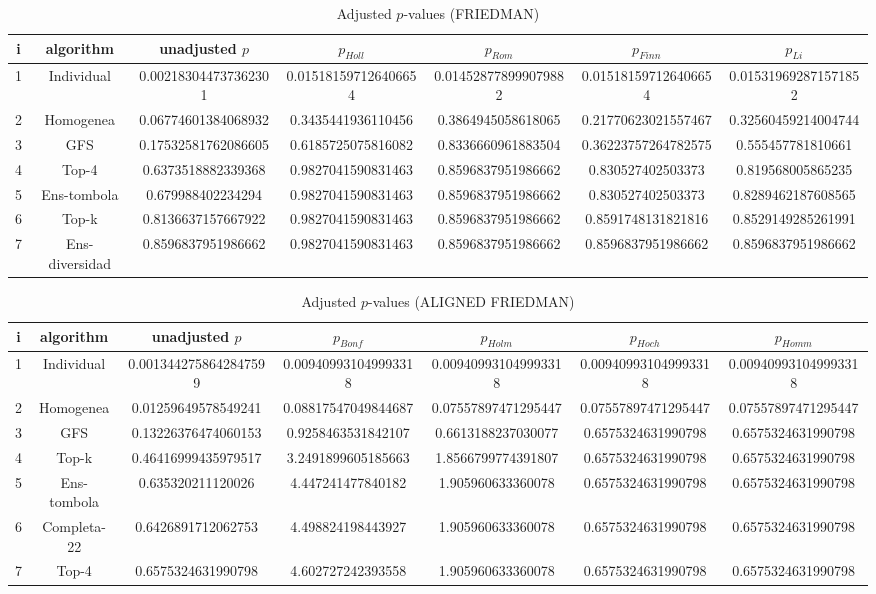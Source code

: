 \documentclass[a4paper,10pt]{article}
\begin{document}
\begin{landscape}
\begin{table}[!htp]
\centering\scriptsize
\caption{Adjusted $p$-values (FRIEDMAN)}
\begin{tabular}{ccccccc}
i&algorithm&unadjusted $p$&$p_{Holl}$&$p_{Rom}$&$p_{Finn}$&$p_{Li}$\\
\hline
1&Individual&0.002183044737362301&0.015181597126406654&0.014528778999079882&0.015181597126406654&0.015319692871571852\\
2&Homogenea&0.06774601384068932&0.3435441936110456&0.3864945058618065&0.21770623021557467&0.32560459214004744\\
3&GFS&0.17532581762086605&0.6185725075816082&0.8336660961883504&0.36223757264782575&0.555457781810661\\
4&Top-4&0.6373518882339368&0.9827041590831463&0.8596837951986662&0.830527402503373&0.819568005865235\\
5&Ens-tombola&0.679988402234294&0.9827041590831463&0.8596837951986662&0.830527402503373&0.8289462187608565\\
6&Top-k&0.8136637157667922&0.9827041590831463&0.8596837951986662&0.8591748131821816&0.8529149285261991\\
7&Ens-diversidad&0.8596837951986662&0.9827041590831463&0.8596837951986662&0.8596837951986662&0.8596837951986662\\
\hline
\end{tabular}
\end{table}


\newpage

\begin{table}[!htp]
\centering\scriptsize
\caption{Adjusted $p$-values (ALIGNED FRIEDMAN)}
\begin{tabular}{ccccccc}
i&algorithm&unadjusted $p$&$p_{Bonf}$&$p_{Holm}$&$p_{Hoch}$&$p_{Homm}$\\
\hline
1&Individual&0.0013442758642847599&0.009409931049993318&0.009409931049993318&0.009409931049993318&0.009409931049993318\\
2&Homogenea&0.01259649578549241&0.08817547049844687&0.07557897471295447&0.07557897471295447&0.07557897471295447\\
3&GFS&0.13226376474060153&0.9258463531842107&0.6613188237030077&0.6575324631990798&0.6575324631990798\\
4&Top-k&0.46416999435979517&3.2491899605185663&1.8566799774391807&0.6575324631990798&0.6575324631990798\\
5&Ens-tombola&0.635320211120026&4.447241477840182&1.905960633360078&0.6575324631990798&0.6575324631990798\\
6&Completa-22&0.6426891712062753&4.498824198443927&1.905960633360078&0.6575324631990798&0.6575324631990798\\
7&Top-4&0.6575324631990798&4.602727242393558&1.905960633360078&0.6575324631990798&0.6575324631990798\\
\hline
\end{tabular}
\end{table}


\end{landscape}
\end{document}
